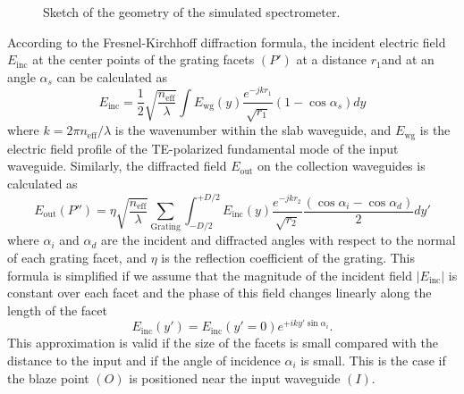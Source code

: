 \documentclass[12pt,twoside,english]{book}
\renewcommand{\~}{\perispomeni}%
\numberwithin{equation}{section}
\numberwithin{figure}{section}
\begin{document}
%
\begin{figure}[H]
\noindent \begin{centering}
\center{}
\par\end{centering}
\noindent \centering\caption{Sketch of the geometry of the simulated spectrometer.\label{fig:Huygens sketch}}
\end{figure}

According to the Fresnel-Kirchhoff diffraction formula, the incident electric field $E_{\text{inc}}$ at the center points of the grating facets $\left(P'\right)$ at a distance $r_{1}$and at an angle $\alpha_{s}$
can be calculated as 
\begin{equation}
E_{\text{inc}}=\frac{1}{2}\sqrt{\frac{n_{\text{eff}}}{\lambda}}\int E_{\text{wg}}\left(y\right)\frac{e^{-jkr_{1}}}{\sqrt{r_{1}}}\left(1-\cos\alpha_{s}\right)dy\end{equation}
where $k=2\pi n_{\text{eff}}/\lambda$ is the wavenumber within the slab waveguide, and $E_{\text{wg}}$ is the electric field profile of the TE-polarized fundamental mode of the input waveguide. Similarly, the diffracted field $E_{\text{out}}$ on the collection waveguides is calculated as 
\begin{equation}
E_{\text{out}}\left(P''\right)=\eta\sqrt{\frac{n_{\text{eff}}}{\lambda}}\sum_{\text{Grating}}\int_{-D/2}^{+D/2}E_{\text{inc}}\left(y\right)\frac{e^{-jkr_{2}}}{\sqrt{r_{2}}}\frac{\left(\cos\alpha_{i}-\cos\alpha_{d}\right)}{2}dy'\end{equation}
where $\alpha_{i}$ and $\alpha_{d}$ are the incident and diffracted angles with respect to the normal of each grating facet, and $\eta$ is the reflection coefficient of the grating. This formula is simplified if we assume that the magnitude of the incident field $\left|E_{\text{inc}}\right|$ is constant over each facet and the phase of this field changes linearly along the length of the facet
\begin{equation}
E_{\text{inc}}\left(y'\right)=E_{\text{inc}}\left(y'=0\right)e^{+iky'\sin\alpha_{i}}.\end{equation}
This approximation is valid if the size of the facets is small compared with the distance to the input and if the angle of incidence $\alpha_{i}$ is small. This is the case if the blaze point $\left(O\right)$ is positioned near the input waveguide $\left(I\right)$. 

\end{document}
